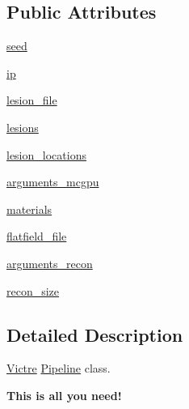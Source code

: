\subsection*{Public Attributes}
\begin{DoxyCompactItemize}
\item 
\hyperlink{classVictre_1_1Pipeline_1_1Pipeline_aa252e7c9269262d7c97deb49112caef3}{seed}
\item 
\hyperlink{classVictre_1_1Pipeline_1_1Pipeline_a43757d24ebee55a97ad659c6e0cb27ad}{ip}
\item 
\hyperlink{classVictre_1_1Pipeline_1_1Pipeline_a7cbcebfc89ab01d7c2f51cfd39ea3dae}{lesion\-\_\-file}
\item 
\hyperlink{classVictre_1_1Pipeline_1_1Pipeline_acf86f8174c970edae18400315e841c16}{lesions}
\item 
\hyperlink{classVictre_1_1Pipeline_1_1Pipeline_a0fb31f166001c15f1a20349d4679e9a3}{lesion\-\_\-locations}
\item 
\hyperlink{classVictre_1_1Pipeline_1_1Pipeline_a9b64bd35b445bbdf6732b7567910e567}{arguments\-\_\-mcgpu}
\item 
\hyperlink{classVictre_1_1Pipeline_1_1Pipeline_a8b81342be465b5c99ba7da997fc6fd5c}{materials}
\item 
\hyperlink{classVictre_1_1Pipeline_1_1Pipeline_abcb9cb7ffcd4a4a69dccf0fb2ca03d54}{flatfield\-\_\-file}
\item 
\hyperlink{classVictre_1_1Pipeline_1_1Pipeline_a19f258798c13c0a6fdbe9c2d09f1b026}{arguments\-\_\-recon}
\item 
\hyperlink{classVictre_1_1Pipeline_1_1Pipeline_a17245decfa597e911b0c12be88a3fb96}{recon\-\_\-size}
\end{DoxyCompactItemize}


\subsection{Detailed Description}
\hyperlink{namespaceVictre}{Victre} \hyperlink{classVictre_1_1Pipeline_1_1Pipeline}{Pipeline} class. 

{\bfseries This is all you need!} 

